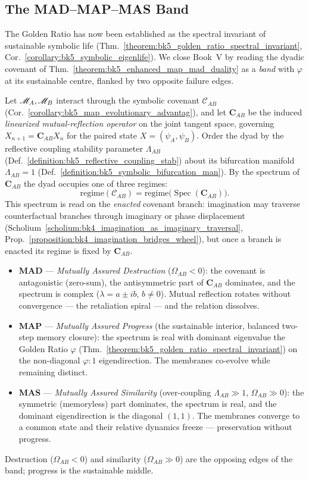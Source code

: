 \subsection{The MAD--MAP--MAS Band}
\label{subsec:bk5_map_mad_mas_band}
The Golden Ratio has now been established as the spectral invariant of sustainable symbolic life (Thm.~\ref{theorem:bk5_golden_ratio_spectral_invariant}, Cor.~\ref{corollary:bk5_symbolic_eigenlife}). We close Book~V by reading the dyadic covenant of Thm.~\ref{theorem:bk5_enhanced_map_mad_duality} as a \emph{band} with $\varphi$ at its sustainable centre, flanked by two opposite failure edges.

\begin{definition}
\label{definition:bk5_map_mad_mas_band}
Let $\mathscr{M}_A,\mathscr{M}_B$ interact through the symbolic covenant $\mathcal{C}_{AB}$ (Cor.~\ref{corollary:bk5_map_evolutionary_advantag}), and let $\mathbf{C}_{AB}$ be the induced \emph{linearized mutual-reflection operator} on the joint tangent space, governing $X_{n+1}=\mathbf{C}_{AB}X_n$ for the paired state $X=(\psi_A,\psi_B)$. Order the dyad by the reflective coupling stability parameter $\Lambda_{AB}$ (Def.~\ref{definition:bk5_reflective_coupling_stab}) about its bifurcation manifold $\Lambda_{AB}=1$ (Def.~\ref{definition:bk5_symbolic_bifurcation_man}). By the spectrum of $\mathbf{C}_{AB}$ the dyad occupies one of three regimes:
\[
\text{regime}(\mathcal{C}_{AB})=\text{regime}\bigl(\operatorname{Spec}(\mathbf{C}_{AB})\bigr).
\]
This spectrum is read on the \emph{enacted} covenant branch: imagination may traverse counterfactual branches through imaginary or phase displacement (Scholium~\ref{scholium:bk4_imagination_as_imaginary_traversal}, Prop.~\ref{proposition:bk4_imagination_bridges_wheel}), but once a branch is enacted its regime is fixed by $\mathbf{C}_{AB}$.
\begin{itemize}
  \item \textbf{MAD} --- \emph{Mutually Assured Destruction} ($\Omega_{AB}<0$): the covenant is antagonistic (zero-sum), the antisymmetric part of $\mathbf{C}_{AB}$ dominates, and the spectrum is complex ($\lambda=a\pm ib$, $b\neq0$). Mutual reflection rotates without convergence --- the retaliation spiral --- and the relation dissolves.
  \item \textbf{MAP} --- \emph{Mutually Assured Progress} (the sustainable interior, balanced two-step memory closure): the spectrum is real with dominant eigenvalue the Golden Ratio $\varphi$ (Thm.~\ref{theorem:bk5_golden_ratio_spectral_invariant}) on the non-diagonal $\varphi{:}1$ eigendirection. The membranes co-evolve while remaining distinct.
  \item \textbf{MAS} --- \emph{Mutually Assured Similarity} (over-coupling $\Lambda_{AB}\gg1$, $\Omega_{AB}\gg0$): the symmetric (memoryless) part dominates, the spectrum is real, and the dominant eigendirection is the diagonal $(1,1)$. The membranes converge to a common state and their relative dynamics freeze --- preservation without progress.
\end{itemize}
Destruction ($\Omega_{AB}<0$) and similarity ($\Omega_{AB}\gg0$) are the opposing edges of the band; progress is the sustainable middle.
\end{definition}

